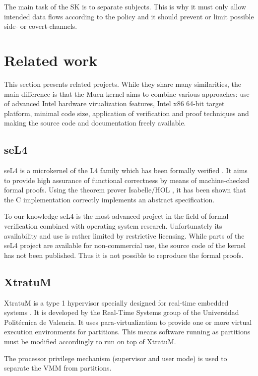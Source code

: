 The main task of the SK is to separate subjects. This is why it must only allow
intended data flows according to the policy and it should prevent or limit
possible side- or covert-channels.

\section{Related work}
This section presents related projects. While they share many similarities, the
main difference is that the Muen kernel aims to combine various approaches: use
of advanced Intel hardware virualization features, Intel x86 64-bit target
platform, minimal code size, application of verification and proof techniques
and making the source code and documentation freely available.

\subsection{seL4}
seL4 is a microkernel of the L4 \cite{Liedtke:1996:TRM:234215.234473} family
which has been formally verified \cite{Klein_EHACDEEKNSTW_09}. It aims to
provide high assurance of functional correctness by means of machine-checked
formal proofs. Using the theorem prover Isabelle/HOL
\cite{Nipkow-Paulson-Wenzel:2002}, it has been shown that the C implementation
correctly implements an abstract specification.

To our knowledge seL4 is the most advanced project in the field of formal
verification combined with operating system research. Unfortunately its
availability and use is rather limited by restrictive licensing. While parts of
the seL4 project are available for non-commercial use, the source code of the
kernel has not been published. Thus it is not possible to reproduce the formal
proofs.

\subsection{XtratuM}
XtratuM is a type 1 hypervisor specially designed for real-time embedded
systems \cite{xtratum:2009a}. It is developed by the Real-Time Systems group of
the Universidad Politécnica de Valencia. It uses para-virtualization to provide
one or more virtual execution environments for partitions. This means
software running as partitions must be modified accordingly to run on top of
XtratuM.

The processor privilege mechanism (supervisor and user mode) is used to
separate the VMM from partitions.

